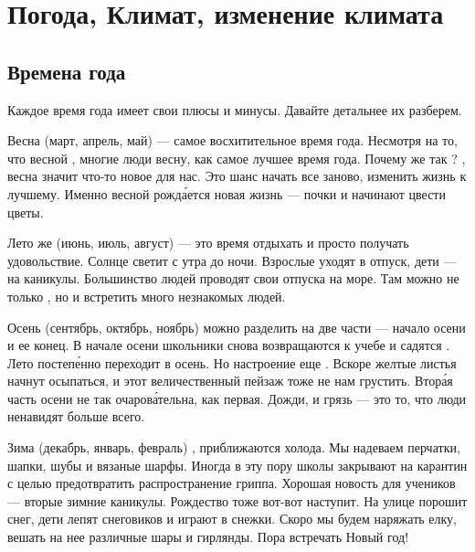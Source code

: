 \chapter{Погода, Климат, изменение климата}

\section{Времена года}
Каждое время года имеет свои плюсы и минусы. Давайте детальнее их разберем.

Весна (март, апрель, май) --- самое восхитительное время года. Несмотря на то, что весной  , многие люди  весну, как самое лучшее время года. Почему же так ? , весна значит что-то новое для нас. Это шанс начать все заново, изменить жизнь к лучшему. Именно весной рожд\'{а}ется новая жизнь ---  почки и начинают цвести цветы.

Лето же (июнь, июль, август) --- это время отдыхать и просто получать удовольствие. Солнце светит с утра до ночи. Взрослые уходят в отпуск, дети --- на каникулы. Большинство людей проводят свои отпуска на море. Там можно не только , но и встретить много незнакомых людей.

Осень (сентябрь, октябрь, ноябрь) можно разделить на две части --- начало осени и ее конец. В начале осени школьники снова возвращаются к учебе и садятся . Лето постеп\'{е}нно переходит в осень. Но настроение еще . Вскоре желтые листья начнут осыпаться, и этот величественный пейзаж тоже не  нам грустить. Втор\'{а}я часть осени не так очаров\'{а}тельна, как первая. Дожди,  и грязь --- это то, что люди ненавидят больше всего.

Зима (декабрь, январь, февраль) , приближаются холода. Мы надеваем перчатки, шапки, шубы и вязаные шарфы. Иногда в эту пору школы закрывают на карантин с целью предотвратить распространение гриппа. Хорошая новость для учеников --- вторые зимние каникулы. Рождество тоже вот-вот наступит. На улице порошит снег, дети лепят снеговиков и играют в снежки. Скоро мы будем наряжать елку, вешать на нее различные шары и гирлянды. Пора встречать Новый год!
